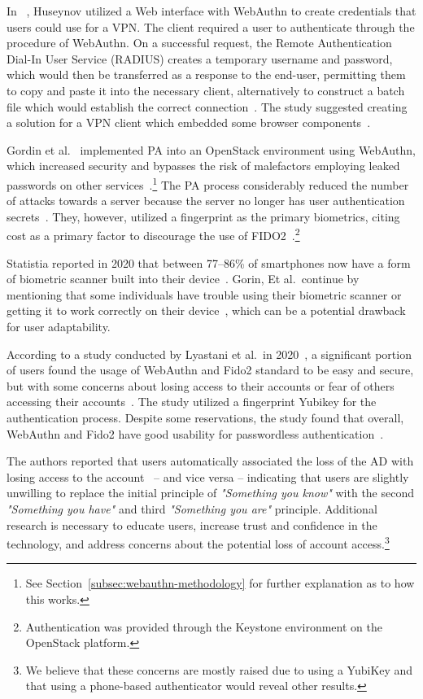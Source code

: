 In ~\cite{huseynov2022passwordless}, Huseynov utilized a Web interface with
WebAuthn to create credentials that users could use for a VPN\@.
The client required a user to authenticate through the procedure of WebAuthn.
On a successful request, the Remote Authentication Dial-In User Service (RADIUS)
creates a temporary username and password, which would then be transferred
as a response to the end-user, permitting them to copy and paste it into the
necessary client, alternatively to construct a batch file which would establish
the correct connection~\cite{huseynov2022passwordless}.
The study suggested creating a solution for a VPN client which embedded some
browser components~\cite{huseynov2022passwordless}.

Gordin et al.~\cite{gordin2021moving} implemented PA into an OpenStack
environment using WebAuthn, which increased security and bypasses the risk of
malefactors employing leaked passwords on other
services~\cite{gordin2021moving}.\footnote{
  See Section~\ref{subsec:webauthn-methodology} for further explanation as to how this
  works.
}
The PA process considerably reduced the number of attacks towards a server
because the server no longer has user authentication
secrets~\cite{gordin2021moving}.
They, however, utilized a fingerprint as the primary biometrics, citing cost as
a primary factor to discourage the use of
FIDO2~\cite{gordin2021moving}.\footnote{
  Authentication was provided through the Keystone environment on the OpenStack
  platform.
}

Statistia reported in 2020 that between 77--86\% of smartphones now have a form
of biometric scanner built into their
device~\cite{statista-biometric-transactions}.
Gorin, Et al.\ continue by mentioning that some individuals have trouble
using their biometric scanner or getting it to work correctly on their
device~\cite{gordin2021moving}, which can be a potential drawback for user
adaptability.

According to a study conducted by Lyastani et al.\ in
2020~\cite{ghrobany2020fido2}, a significant portion of users found the usage
of WebAuthn and Fido2 standard to be easy and secure, but with some concerns
about losing access to their accounts or fear of others accessing their
accounts~\cite{ghrobany2020fido2}.
The study utilized a fingerprint Yubikey for the authentication process.
Despite some reservations, the study found that overall, WebAuthn and Fido2
have good usability for passwordless authentication~\cite{ghrobany2020fido2}.

The authors reported that users automatically associated the loss of the AD with
losing access to the account~\cite{ghrobany2020fido2} -- and vice versa --
indicating that users are slightly unwilling to replace the initial principle of
\textit{"Something you know"} with the second \textit{"Something you have"} and
third \textit{"Something you are"} principle.
Additional research is necessary to educate users, increase trust and confidence
in the technology, and address concerns about the potential loss of account
access.\footnote{
  We believe that these concerns are mostly raised due to using a YubiKey
  and that using a phone-based authenticator would reveal other results.
}

